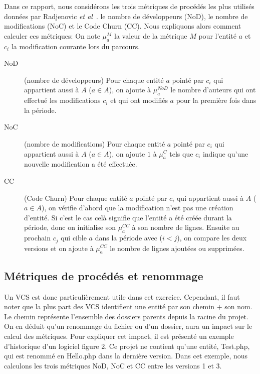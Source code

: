 Dans ce rapport, nous considérons les trois métriques de procédés les plus utilisés données par Radjenovic \emph{et al}~\cite{radjenovic_software_2013}. le nombre de développeurs (NoD), le nombre de modifications (NoC) et le Code Churn (CC). Nous expliquons alors comment calculer ces métriques:
On note $\mu_{a}^{M}$ la valeur de la métrique $M$ pour l'entité $a$ et  $c_i$ la modification courante lors du parcours. 
\begin{description}
	\item[NoD] (nombre de développeurs) Pour chaque entité $a$ pointé par $c_i$ qui appartient aussi à $A$ ($a \in A$), on ajoute à $\mu_{a}^{NoD}$ le nombre d'auteurs qui ont effectué les modifications $c_i$ et qui ont modifiés $a$ pour la première fois dans la période.
	\item[NoC] (nombre de modifications) Pour chaque entité $a$ pointé par $c_i$ qui appartient aussi à $A$ ($a \in A$), on ajoute $1$ à $\mu_{a}^{C}$ tels que $c_i$ indique qu'une nouvelle modification a été effectuée.
	\item[CC] (Code Churn) Pour chaque entité $a$ pointé par $c_i$ qui appartient aussi à $A$ ($a \in A$), on vérifie d'abord que la modification n'est pas une création d'entité. Si c'est le cas celà signifie que l'entité a été créée durant la période, donc on initialise son $\mu_{a}^{CC}$ à son nombre de lignes. Ensuite au prochain $c_j$ qui cible $a$ dans la période avec ($i < j$), on compare les deux versions et on ajoute à $\mu_{a}^{CC}$ le nombre de lignes ajoutées ou supprimées.
\end{description}


\subsection{Métriques de procédés et renommage}

Un VCS est donc particulièrement utile dans cet exercice. Cependant, il faut noter que la plus part des VCS identifient une entité par son chemin $+$ son nom. Le chemin représente l'ensemble des dossiers parents depuis la racine du projet. On en déduit qu'un renommage du fichier ou d'un dossier, aura un impact sur le calcul des métriques. Pour expliquer cet impact, il est présenté un exemple d'historique d'un logiciel figure 2. Ce projet ne contient qu'une entité, Test.php, qui est renommé en Hello.php dans la dernière version. Dans cet exemple, nous calculons les trois métriques NoD, NoC et CC entre les versions 1 et 3.\\

